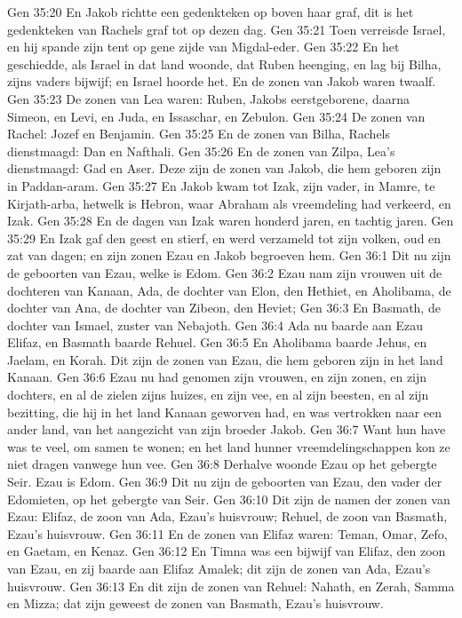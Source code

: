 Gen 35:20  En Jakob richtte een gedenkteken op boven haar graf, dit is het gedenkteken van Rachels graf tot op dezen dag.
Gen 35:21  Toen verreisde Israel, en hij spande zijn tent op gene zijde van Migdal-eder.
Gen 35:22  En het geschiedde, als Israel in dat land woonde, dat Ruben heenging, en lag bij Bilha, zijns vaders bijwijf; en Israel hoorde het. En de zonen van Jakob waren twaalf.
Gen 35:23  De zonen van Lea waren: Ruben, Jakobs eerstgeborene, daarna Simeon, en Levi, en Juda, en Issaschar, en Zebulon.
Gen 35:24  De zonen van Rachel: Jozef en Benjamin.
Gen 35:25  En de zonen van Bilha, Rachels dienstmaagd: Dan en Nafthali.
Gen 35:26  En de zonen van Zilpa, Lea's dienstmaagd: Gad en Aser. Deze zijn de zonen van Jakob, die hem geboren zijn in Paddan-aram.
Gen 35:27  En Jakob kwam tot Izak, zijn vader, in Mamre, te Kirjath-arba, hetwelk is Hebron, waar Abraham als vreemdeling had verkeerd, en Izak.
Gen 35:28  En de dagen van Izak waren honderd jaren, en tachtig jaren.
Gen 35:29  En Izak gaf den geest en stierf, en werd verzameld tot zijn volken, oud en zat van dagen; en zijn zonen Ezau en Jakob begroeven hem.
Gen 36:1  Dit nu zijn de geboorten van Ezau, welke is Edom.
Gen 36:2  Ezau nam zijn vrouwen uit de dochteren van Kanaan, Ada, de dochter van Elon, den Hethiet, en Aholibama, de dochter van Ana, de dochter van Zibeon, den Heviet;
Gen 36:3  En Basmath, de dochter van Ismael, zuster van Nebajoth.
Gen 36:4  Ada nu baarde aan Ezau Elifaz, en Basmath baarde Rehuel.
Gen 36:5  En Aholibama baarde Jehus, en Jaelam, en Korah. Dit zijn de zonen van Ezau, die hem geboren zijn in het land Kanaan.
Gen 36:6  Ezau nu had genomen zijn vrouwen, en zijn zonen, en zijn dochters, en al de zielen zijns huizes, en zijn vee, en al zijn beesten, en al zijn bezitting, die hij in het land Kanaan geworven had, en was vertrokken naar een ander land, van het aangezicht van zijn broeder Jakob.
Gen 36:7  Want hun have was te veel, om samen te wonen; en het land hunner vreemdelingschappen kon ze niet dragen vanwege hun vee.
Gen 36:8  Derhalve woonde Ezau op het gebergte Seir. Ezau is Edom.
Gen 36:9  Dit nu zijn de geboorten van Ezau, den vader der Edomieten, op het gebergte van Seir.
Gen 36:10  Dit zijn de namen der zonen van Ezau: Elifaz, de zoon van Ada, Ezau's huisvrouw; Rehuel, de zoon van Basmath, Ezau's huisvrouw.
Gen 36:11  En de zonen van Elifaz waren: Teman, Omar, Zefo, en Gaetam, en Kenaz.
Gen 36:12  En Timna was een bijwijf van Elifaz, den zoon van Ezau, en zij baarde aan Elifaz Amalek; dit zijn de zonen van Ada, Ezau's huisvrouw.
Gen 36:13  En dit zijn de zonen van Rehuel: Nahath, en Zerah, Samma en Mizza; dat zijn geweest de zonen van Basmath, Ezau's huisvrouw.
